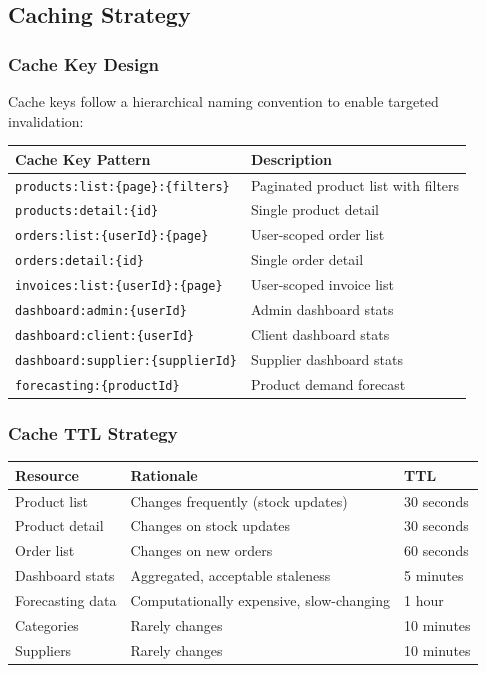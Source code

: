 \documentclass[12pt,onecolumn]{IEEEtran}
\begin{document}
\subsection{Caching Strategy}

\subsubsection{Cache Key Design}

Cache keys follow a hierarchical naming convention to enable targeted invalidation:

\begin{center}
\begin{tabularx}{\textwidth}{lX}
  \toprule
  \textbf{Cache Key Pattern} & \textbf{Description} \\
  \midrule
  \texttt{products:list:\{page\}:\{filters\}} & Paginated product list with filters \\
  \texttt{products:detail:\{id\}} & Single product detail \\
  \texttt{orders:list:\{userId\}:\{page\}} & User-scoped order list \\
  \texttt{orders:detail:\{id\}} & Single order detail \\
  \texttt{invoices:list:\{userId\}:\{page\}} & User-scoped invoice list \\
  \texttt{dashboard:admin:\{userId\}} & Admin dashboard stats \\
  \texttt{dashboard:client:\{userId\}} & Client dashboard stats \\
  \texttt{dashboard:supplier:\{supplierId\}} & Supplier dashboard stats \\
  \texttt{forecasting:\{productId\}} & Product demand forecast \\
  \bottomrule
\end{tabularx}
\end{center}

\subsubsection{Cache TTL Strategy}

\begin{center}
\begin{tabularx}{\textwidth}{lXl}
  \toprule
  \textbf{Resource} & \textbf{Rationale} & \textbf{TTL} \\
  \midrule
  Product list      & Changes frequently (stock updates) & 30 seconds \\
  Product detail    & Changes on stock updates & 30 seconds \\
  Order list        & Changes on new orders & 60 seconds \\
  Dashboard stats   & Aggregated, acceptable staleness & 5 minutes \\
  Forecasting data  & Computationally expensive, slow-changing & 1 hour \\
  Categories        & Rarely changes & 10 minutes \\
  Suppliers         & Rarely changes & 10 minutes \\
  \bottomrule
\end{tabularx}
\end{center}
\end{document}

